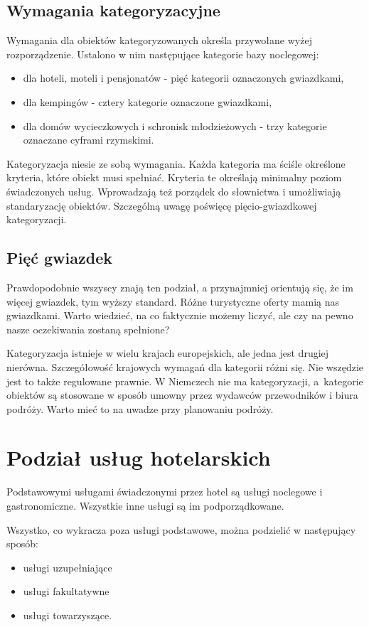 \documentclass[a4paper,onecolumn,oneside,11pt,wide,floatssmall]{mwrep}
\theoremstyle{definition}
\theoremstyle{plain}%
\theoremstyle{remark}
\begin{document}
\subsection{Wymagania kategoryzacyjne}
Wymagania dla obiektów kategoryzowanych określa przywołane wyżej rozporządzenie. 
Ustalono w nim następujące kategorie bazy noclegowej:

\begin{itemize}
  \item dla hoteli, moteli i pensjonatów - pięć kategorii oznaczonych 
  gwiazdkami,
  \item dla kempingów - cztery kategorie oznaczone gwiazdkami,
  \item dla domów wycieczkowych i schronisk młodzieżowych - trzy kategorie 
  oznaczane cyframi rzymskimi.
\end{itemize}

Kategoryzacja niesie ze sobą wymagania. Każda kategoria ma ściśle określone 
kryteria, które obiekt musi spełniać. Kryteria te określają minimalny poziom 
świadczonych usług. Wprowadzają też porządek do słownictwa i umożliwiają 
standaryzację obiektów. Szczególną uwagę poświęcę pięcio-gwiazdkowej 
kategoryzacji.

\subsection{Pięć gwiazdek}
Prawdopodobnie wszyscy znają ten podział, a przynajmniej orientują się, że im 
więcej gwiazdek, tym wyższy standard. Różne turystyczne oferty mamią nas 
gwiazdkami. Warto wiedzieć, na co faktycznie możemy liczyć, ale czy na pewno 
nasze oczekiwania zostaną spełnione? 

Kategoryzacja istnieje w wielu krajach 
europejskich, ale jedna jest drugiej nierówna. Szczegółowość krajowych wymagań dla 
kategorii różni się. Nie wszędzie jest to także regulowane 
prawnie. W Niemczech nie ma kategoryzacji, \mbox{a kategorie} obiektów są stosowane 
w sposób umowny przez wydawców przewodników i biura podróży. Warto mieć to 
na uwadze przy planowaniu podróży.

\section{Podział usług hotelarskich}   
Podstawowymi usługami świadczonymi przez hotel są usługi noclegowe i 
gastronomiczne. Wszystkie inne usługi są im podporządkowane.

Wszystko, co wykracza poza usługi podstawowe, można podzielić w następujący 
sposób:
  \begin{itemize}
    \item usługi uzupełniające
    \item usługi fakultatywne
    \item usługi towarzyszące.
  \end{itemize}
\end{document}
